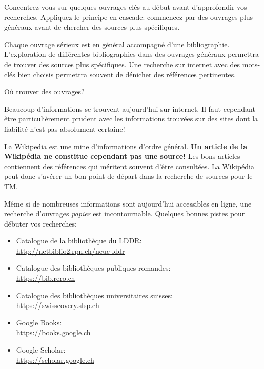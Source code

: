\documentclass[
  a4paper,
]{book}
\makeatletter
\providecommand{\tightlist}{%
  \setlength{\itemsep}{0pt}\setlength{\parskip}{0pt}}\usepackage{longtable,booktabs,array}
\providecommand{\tightlist}{%
  \setlength{\itemsep}{0pt}\setlength{\parskip}{0pt}}
\renewcommand{\subsection}{\@startsection {subsection}{2}{\z@}
{-3ex \@plus -0.1ex \@minus -.4ex}
{0.5ex \@plus.2ex }
{\normalfont\sffamily\bfseries}}
\makeatother
\begin{document}
Concentrez-vous sur quelques ouvrages clés au début avant d'approfondir
vos recherches. Appliquez le principe en cascade: commencez par des
ouvrages plus généraux avant de chercher des sources plus spécifiques.

Chaque ouvrage sérieux est en général accompagné d'une bibliographie.
L'exploration de différentes bibliographies dans des ouvrages généraux
permettra de trouver des sources plus spécifiques. Une recherche sur
internet avec des mots-clés bien choisis permettra souvent de dénicher
des références pertinentes.

\hypertarget{ouxf9-trouver-des-ouvrages}{%
\subsection{Où trouver des ouvrages?}\label{ouxf9-trouver-des-ouvrages}}

Beaucoup d'informations se trouvent aujourd'hui sur internet. Il faut
cependant être particulièrement prudent avec les informations trouvées
sur des sites dont la fiabilité n'est pas absolument certaine!

La Wikipedia est une mine d'informations d'ordre général. \textbf{Un
article de la Wikipédia ne constitue cependant pas une source!} Les bons
articles contiennent des références qui méritent souvent d'être
consultées. La Wikipédia peut donc s'avérer un bon point de départ dans
la recherche de sources pour le TM.

Même si de nombreuses informations sont aujourd'hui accessibles en
ligne, une recherche d'ouvrages \emph{papier} est incontournable.
Quelques bonnes pistes pour débuter vos recherches:

\begin{itemize}
\tightlist
\item
  Catalogue de la bibliothèque du LDDR:\\
  \url{http://netbiblio2.rpn.ch/neuc-lddr}
\item
  Catalogue des bibliothèques publiques romandes:\\
  \url{https://bib.rero.ch}
\item
  Catalogue des bibliothèques universitaires suisses:\\
  \url{https://swisscovery.slsp.ch}
\item
  Google Books:\\
  \url{https://books.google.ch}
\item
  Google Scholar:\\
  \url{https://scholar.google.ch}
\end{itemize}
\end{document}
